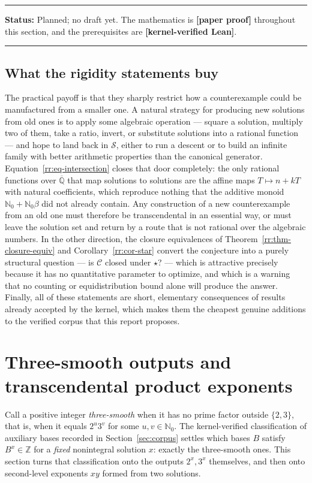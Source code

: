 \documentclass[11pt,oneside]{article}
\theoremstyle{definition}
\theoremstyle{remark}
\newcommand{\Nzero}{\mathbb N_0}
\newcommand{\Z}{\mathbb Z}
\newcommand{\Abar}{\overline{\mathbb Q}}
\newcommand{\Sol}{\mathcal S}
\newcommand{\Cand}{\mathcal C}
\newcommand{\statuslean}{\textcolor{leanblue}{\textbf{[kernel-verified Lean]}}}
\newcommand{\statusnew}{\textcolor{newgreen}{\textbf{[paper proof]}}}
\newenvironment{statusbox}[1]
{\begin{center}\begin{minipage}{0.94\textwidth}\raggedright\hbadness=10000\hrule
\vspace{0.45em}\textbf{Status:} #1\par\vspace{0.35em}}
{\vspace{0.35em}\hrule\end{minipage}\end{center}}
\begin{document}
\begin{statusbox}{Planned; no draft yet.  The mathematics is \statusnew{} throughout this
section, and the prerequisites are \statuslean{}.}
\end{statusbox}

\subsection{What the rigidity statements buy}

The practical payoff is that they sharply restrict how a counterexample could be manufactured
from a smaller one.  A natural strategy for producing new solutions from old ones is to apply
some algebraic operation --- square a solution, multiply two of them, take a ratio, invert,
or substitute solutions into a rational function --- and hope to land back in $\Sol$, either
to run a descent or to build an infinite family with better arithmetic properties than the
canonical generator.  Equation~\eqref{rr:eq-intersection} closes that door completely: the
only rational functions over $\Abar$ that map solutions to solutions are the affine maps
$T\mapsto n+kT$ with natural coefficients, which reproduce nothing that the additive monoid
$\Nzero+\Nzero\beta$ did not already contain.  Any construction of a new counterexample from
an old one must therefore be transcendental in an essential way, or must leave the solution
set and return by a route that is not rational over the algebraic numbers.  In the other
direction, the closure equivalences of Theorem~\ref{rr:thm-closure-equiv} and
Corollary~\ref{rr:cor-star} convert the conjecture into a purely structural question --- is
$\Cand$ closed under $\star$? --- which is attractive precisely because it has no
quantitative parameter to optimize, and which is a warning that no counting or
equidistribution bound alone will produce the answer.  Finally, all of these statements are
short, elementary consequences of results already accepted by the kernel, which makes them
the cheapest genuine additions to the verified corpus that this report proposes.

\section{Three-smooth outputs and transcendental product exponents}\label{sec:smooth}

Call a positive integer \emph{three-smooth} when it has no prime factor outside
$\{2,3\}$, that is, when it equals $2^u3^v$ for some $u,v\in\Nzero$.  The kernel-verified
classification of auxiliary bases recorded in Section~\ref{sec:corpus} settles which bases
$B$ satisfy $B^x\in\Z$ for a \emph{fixed} nonintegral solution $x$: exactly the three-smooth
ones.  This section turns that classification onto the outputs $2^x,3^x$ themselves, and
then onto second-level exponents $xy$ formed from two solutions.
\end{document}
